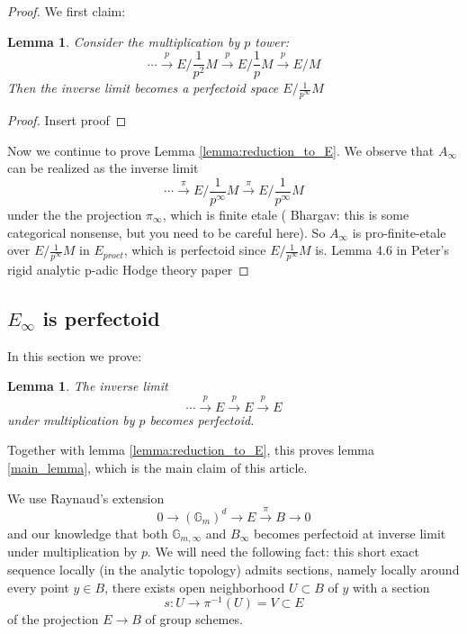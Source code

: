 \documentclass[11pt,oneside]{amsart}
\theoremstyle{theorem}
\newtheorem{lemma}[theorem]{Lemma}
\theoremstyle{definition}
\theoremstyle{remark}
\begin{document}
\begin{proof}
We first claim: 
\begin{lemma}
Consider the multiplication by $p$ tower: 
$$ \cdots \xrightarrow{p}  E/\frac{1}{p^2} M  \xrightarrow{p}    E/\frac{1}{p} M  \xrightarrow{p}   E/M $$
Then the inverse limit becomes a perfectoid space $E/\frac{1}{p^\infty} M$
\end{lemma}

\begin{proof} 
{\color{red} Insert proof}
\end{proof} 


Now we continue to prove Lemma \ref{lemma:reduction_to_E}. We observe that $A_\infty$ can be realized as the inverse limit 
$$\cdots \xrightarrow{\pi} E/\frac{1}{p^\infty} M  \xrightarrow{\pi} E/\frac{1}{p^\infty} M$$ under the the projection $\pi_\infty$, which is finite etale ({\color{blue} Bhargav: this is some categorical nonsense, but you need to be careful here}). So $A_\infty$ is pro-finite-etale over $E/\frac{1}{p^\infty} M$ in $E_{proet}$, which is perfectoid since  $E/\frac{1}{p^\infty} M$  is.  {\color{red}  Lemma 4.6 in Peter's rigid analytic p-adic Hodge theory paper} 

\end{proof} 



\subsection{$E_\infty$ is perfectoid}

In this section we prove: 

\begin{lemma} \label{lemma:E_is_perfectoid}
The inverse limit
$$ \cdots  \xrightarrow{p} E   \xrightarrow{p} E   \xrightarrow{p} E  $$
under multiplication by $p$ becomes perfectoid.  
\end{lemma}

Together with lemma \ref{lemma:reduction_to_E}, this proves lemma \ref{main_lemma}, which is the main claim of this article. 

We use Raynaud's extension 
$$ 0 \rightarrow (\mathbb G_m)^d \rightarrow E \xrightarrow{\pi} B \rightarrow 0 $$ and our knowledge that both $\mathbb G_{m, \infty}$ and $B_\infty$ becomes perfectoid at inverse limit under multiplication by $p$. We will need the following fact: this short exact sequence locally (in the analytic topology) admits sections, namely locally around every point $y \in B$, there exists open neighborhood  $U \subset B$ of $y$ with a section
$$s: U \rightarrow \pi^{-1} (U) = V \subset E$$ of the projection $E \rightarrow B$ of group schemes. 
\end{document}
